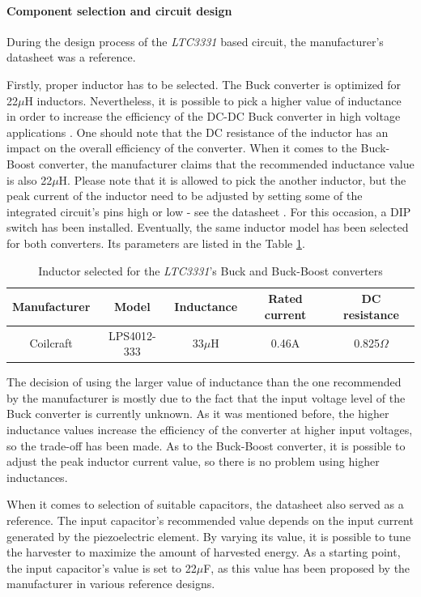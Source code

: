 \documentclass[12pt,a4paper]{article}
\begin{document}
\paragraph{Component selection and circuit design}
During the design process of the \textit{LTC3331} based circuit, the manufacturer's datasheet \cite{ltc3331_params} was a reference.
\par
Firstly, proper inductor has to be selected. The Buck converter is optimized for 22$\mu$H inductors. Nevertheless, it is possible to pick a higher value of inductance in order to increase the efficiency of the DC-DC Buck converter in high voltage applications \cite{ltc3331_params}. One should note that the DC resistance of the inductor has an impact on the overall efficiency of the converter. When it comes to the Buck-Boost converter, the manufacturer claims that the recommended inductance value is also 22$\mu$H. Please note that it is allowed to pick the another inductor, but the peak current of the inductor need to be adjusted by setting some of the integrated circuit's pins high or low - see the datasheet \cite{ltc3331_params}. For this occasion, a DIP switch has been installed. Eventually, the same inductor model has been selected for both converters. Its parameters are listed in the Table \ref{tab:ltc3331_inductor}.
\begin{table}[ht!]
\begin{tabular}{|c|c|c|c|c|}
\hline
\textbf{Manufacturer} & \textbf{Model} & \textbf{Inductance} & \textbf{Rated current} & \textbf{DC resistance}	\\ \hline
 Coilcraft & LPS4012-333 & 33$\mu$H & 0.46A & 0.825$\Omega$      \\ \hline
\end{tabular}
\caption{Inductor selected for the \textit{LTC3331}'s Buck and Buck-Boost converters \cite{ltc3331_inductor_params}}
\label{tab:ltc3331_inductor}
\end{table}
\par
The decision of using the larger value of inductance than the one recommended by the manufacturer is mostly due to the fact that the input voltage level of the Buck converter is currently unknown. As it was mentioned before, the higher inductance values increase the efficiency of the converter at higher input voltages, so the trade-off has been made. As to the Buck-Boost converter, it is possible to adjust the peak inductor current value, so there is no problem using higher inductances.
\par
When it comes to selection of suitable capacitors, the datasheet \cite{ltc3331_params} also served as a reference.
The input capacitor's recommended value depends on the input current generated by the piezoelectric element. By varying its value, it is possible to tune the harvester to maximize the amount of harvested energy. As a starting point, the input capacitor's value is set to 22$\mu$F, as this value has been proposed by the manufacturer in various reference designs.\par
\end{document}

